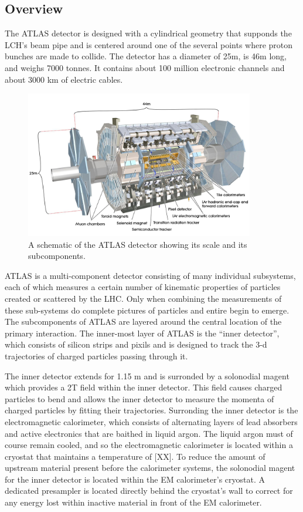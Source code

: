 \subsection{Overview}

The ATLAS detector is designed with a cylindrical geometry that supponds the LCH's beam pipe and is centered around one of the several points where proton bunches are made to collide.
The detector has a diameter of 25m, is 46m long, and weighs 7000 tonnes.
It contains about 100 million electronic channels and about 3000 km of electric cables.

\begin{figure}
  \begin{center}
    \includegraphics[width=100mm]{figures/atlas/AtlasDetecterOverview.jpg}
  \end{center}
  \caption{A schematic of the ATLAS detector showing its scale and its subcomponents.}
  \label{img:AtlasDetectorOverview}
\end{figure}

ATLAS is a multi-component detector consisting of many individual subsystems, each of which measures a certain number of kinematic properties of particles created or scattered by the LHC.
Only when combining the measurements of these sub-systems do complete pictures of particles and entire begin to emerge.
The subcomponents of ATLAS are layered around the central location of the primary interaction.
The inner-most layer of ATLAS is the ``inner detector'', which consists of silicon strips and pixils and is designed to track the 3-d trajectories of charged particles passing through it.

The inner detector extends for 1.15 m and is surronded by a solonodial magent which provides a 2T field within the inner detector.
This field causes charged particles to bend and allows the inner detector to measure the momenta of charged particles by fitting their trajectories.
Surronding the inner detector is the electromagnetic calorimeter, which consists of alternating layers of lead absorbers and active electronics that are baithed in liquid argon.
The liquid argon must of course remain cooled, and so the electromagnetic calorimeter is located within a cryostat that maintains a temperature of [XX].
To reduce the amount of upstream material present before the calorimeter systems, the solonodial magent for the inner detector is located within the EM calorimeter's cryostat.
A dedicated presampler is located directly behind the cryostat's wall to correct for any energy lost within inactive material in front of the EM calorimeter.

